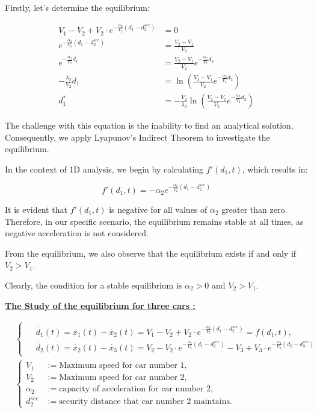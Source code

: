 \documentclass{article}
\begin{document}
	Firstly, let's determine the equilibrium:
	
	\begin{align*}
		V_1 - V_2 + V_2 \cdot e^{-\frac{\alpha_2}{V_2}(d_1 - d_{2}^{sec})} &= 0 \\
		e^{-\frac{\alpha_2}{V_2}(d_1 - d_{2}^{sec})} &= \frac{V_2-V_1}{V_2} \\
		e^{-\frac{\alpha_2}{V_2}d_1} &= \frac{V_2-V_1}{V_2}e^{-\frac{\alpha_2}{V_2}d_2} \\
		-\frac{\lambda_2}{V_2}d_1 &= \ln \left(\frac{V_2-V_1}{V_2}e^{-\frac{\alpha_2}{V_2}d_2} \right) \\
		d_1^* &= -\frac{V_2}{\lambda_2}\ln \left(\frac{V_2-V_1}{V_2}e^{-\frac{\alpha_2}{V_2}d_2} \right)
	\end{align*}
	
	The challenge with this equation is the inability to find an analytical solution. Consequently, we apply Lyapunov's Indirect Theorem to investigate the equilibrium.
	
	In the context of 1D analysis, we begin by calculating $f'(d_1, t)$, which results in:
	
	\[
	f'(d_1, t) = -\alpha_2e^{-\frac{\alpha_2}{V_2}(d_1 - d_{2}^{sec})}
	\]
	
	It is evident that $f'(d_1, t)$ is negative for all values of $\alpha_2$ greater than zero. Therefore, in our specific scenario, the equilibrium remains stable at all times, as negative acceleration is not considered.
	
	From the equilibrium, we also observe that the equilibrium exists if and only if $V_2 > V_1$.
	
	Clearly, the condition for a stable equilibrium is $\alpha_2 > 0$ and $V_2 > V_1$.
	
	
	\textbf{\underline{The Study of the equilibrium for three cars : }} \newline\newline
	
	\begin{align*}
		&\begin{cases}
			\begin{aligned}
				&\dot{d_1}(t) = \dot{x_1}(t) - \dot{x_2}(t) = V_1 - V_2 + V_2 \cdot e^{-\frac{\alpha_2}{V_2}(d_1 - d_{2}^{sec})} = f(d_1, t), \\
				&\dot{d_2}(t) = \dot{x_2}(t)-\dot{x_3}(t) = V_2 - V_2 \cdot e^{-\frac{\alpha_2}{V_2}(d_1 - d_{2}^{sec})} - V_3 + V_3 \cdot e^{-\frac{\alpha_3}{V_3}(d_2 - d_{3}^{sec})}
			\end{aligned}
		\end{cases}
		 \\
		&\left\{
		\begin{aligned}
			V_1 &:= \text{Maximum speed for car number 1}, \\
			V_2 &:= \text{Maximum speed for car number 2}, \\
			\alpha_2 &:= \text{capacity of acceleration for car number 2}, \\
			d_{2}^{sec} &:= \text{security distance that car number 2 maintains}.
		\end{aligned}
		\right.
	\end{align*}
	
\end{document}
